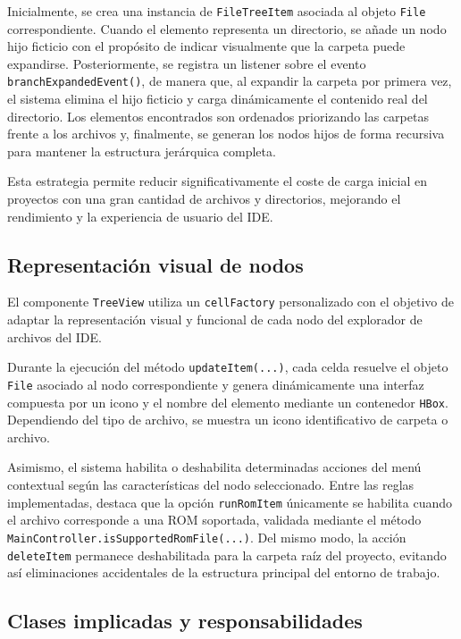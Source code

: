 \documentclass[../../main.tex]{subfiles}
\begin{document}
Inicialmente, se crea una instancia de \lstinline|FileTreeItem| asociada al objeto \lstinline|File| correspondiente. Cuando el elemento representa un directorio, se añade un nodo hijo ficticio con el propósito de indicar visualmente que la carpeta puede expandirse. Posteriormente, se registra un listener sobre el evento \lstinline|branchExpandedEvent()|, de manera que, al expandir la carpeta por primera vez, el sistema elimina el hijo ficticio y carga dinámicamente el contenido real del directorio. Los elementos encontrados son ordenados priorizando las carpetas frente a los archivos y, finalmente, se generan los nodos hijos de forma recursiva para mantener la estructura jerárquica completa. 

Esta estrategia permite reducir significativamente el coste de carga inicial en proyectos con una gran cantidad de archivos y directorios, mejorando el rendimiento y la experiencia de usuario del IDE.

\subsection{Representación visual de nodos}

El componente \lstinline|TreeView| utiliza un \lstinline|cellFactory| personalizado con el objetivo de adaptar la representación visual y funcional de cada nodo del explorador de archivos del IDE. 

Durante la ejecución del método \lstinline|updateItem(...)|, cada celda resuelve el objeto \lstinline|File| asociado al nodo correspondiente y genera dinámicamente una interfaz compuesta por un icono y el nombre del elemento mediante un contenedor \lstinline|HBox|. Dependiendo del tipo de archivo, se muestra un icono identificativo de carpeta o archivo. 

Asimismo, el sistema habilita o deshabilita determinadas acciones del menú contextual según las características del nodo seleccionado. Entre las reglas implementadas, destaca que la opción \lstinline|runRomItem| únicamente se habilita cuando el archivo corresponde a una ROM soportada, validada mediante el método \lstinline|MainController.isSupportedRomFile(...)|. Del mismo modo, la acción \lstinline|deleteItem| permanece deshabilitada para la carpeta raíz del proyecto, evitando así eliminaciones accidentales de la estructura principal del entorno de trabajo.

\subsection{Clases implicadas y responsabilidades}
\end{document}
